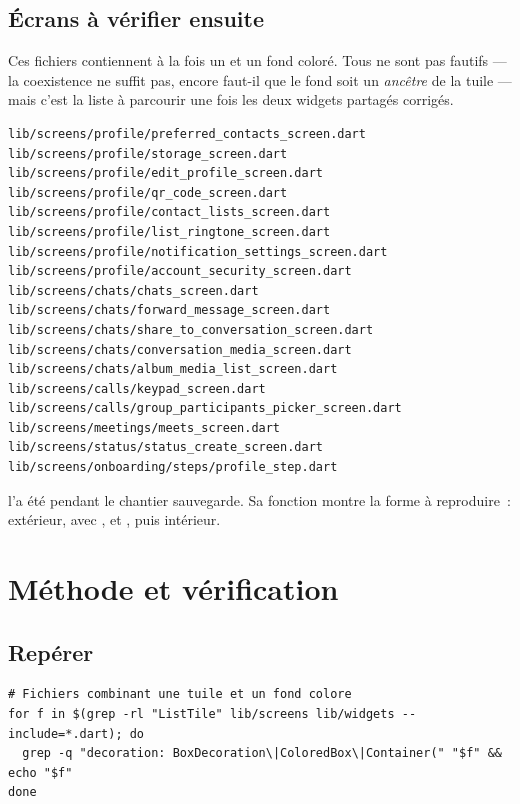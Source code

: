 \documentclass[11pt,a4paper,oneside]{report}
\begin{document}
\section{Écrans à vérifier ensuite}

Ces fichiers contiennent à la fois un  et un fond coloré. Tous ne
sont pas fautifs --- la coexistence ne suffit pas, encore faut-il que le fond
soit un \emph{ancêtre} de la tuile --- mais c'est la liste à parcourir une fois
les deux widgets partagés corrigés.

\begin{lstlisting}[style=Alanya, language={}]
lib/screens/profile/preferred_contacts_screen.dart
lib/screens/profile/storage_screen.dart
lib/screens/profile/edit_profile_screen.dart
lib/screens/profile/qr_code_screen.dart
lib/screens/profile/contact_lists_screen.dart
lib/screens/profile/list_ringtone_screen.dart
lib/screens/profile/notification_settings_screen.dart
lib/screens/profile/account_security_screen.dart
lib/screens/chats/chats_screen.dart
lib/screens/chats/forward_message_screen.dart
lib/screens/chats/share_to_conversation_screen.dart
lib/screens/chats/conversation_media_screen.dart
lib/screens/chats/album_media_list_screen.dart
lib/screens/calls/keypad_screen.dart
lib/screens/calls/group_participants_picker_screen.dart
lib/screens/meetings/meets_screen.dart
lib/screens/status/status_create_screen.dart
lib/screens/onboarding/steps/profile_step.dart
\end{lstlisting}

\begin{note}
 l'a été pendant le chantier
sauvegarde. Sa fonction  montre la forme à reproduire~:
 extérieur,  avec , 
et , puis  intérieur.
\end{note}

\chapter{Méthode et vérification}

\section{Repérer}

\begin{lstlisting}[style=Alanya, language={}]
# Fichiers combinant une tuile et un fond colore
for f in $(grep -rl "ListTile" lib/screens lib/widgets --include=*.dart); do
  grep -q "decoration: BoxDecoration\|ColoredBox\|Container(" "$f" && echo "$f"
done
\end{lstlisting}
\end{document}
